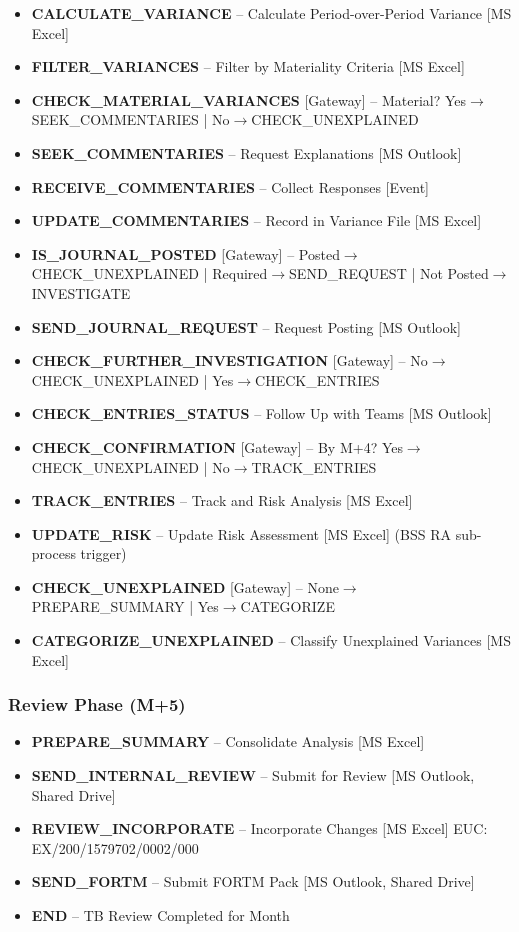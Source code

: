\documentclass[11pt,a4paper]{article}
\begin{document}
\begin{itemize}[noitemsep]
    \item \textbf{CALCULATE\_VARIANCE} -- Calculate Period-over-Period Variance [MS Excel]
    \item \textbf{FILTER\_VARIANCES} -- Filter by Materiality Criteria [MS Excel]
    \item \textbf{CHECK\_MATERIAL\_VARIANCES} [Gateway] -- Material? Yes$\rightarrow$SEEK\_COMMENTARIES | No$\rightarrow$CHECK\_UNEXPLAINED
    \item \textbf{SEEK\_COMMENTARIES} -- Request Explanations [MS Outlook]
    \item \textbf{RECEIVE\_COMMENTARIES} -- Collect Responses [Event]
    \item \textbf{UPDATE\_COMMENTARIES} -- Record in Variance File [MS Excel]
    \item \textbf{IS\_JOURNAL\_POSTED} [Gateway] -- Posted$\rightarrow$CHECK\_UNEXPLAINED | Required$\rightarrow$SEND\_REQUEST | Not Posted$\rightarrow$INVESTIGATE
    \item \textbf{SEND\_JOURNAL\_REQUEST} -- Request Posting [MS Outlook]
    \item \textbf{CHECK\_FURTHER\_INVESTIGATION} [Gateway] -- No$\rightarrow$CHECK\_UNEXPLAINED | Yes$\rightarrow$CHECK\_ENTRIES
    \item \textbf{CHECK\_ENTRIES\_STATUS} -- Follow Up with Teams [MS Outlook]
    \item \textbf{CHECK\_CONFIRMATION} [Gateway] -- By M+4? Yes$\rightarrow$CHECK\_UNEXPLAINED | No$\rightarrow$TRACK\_ENTRIES
    \item \textbf{TRACK\_ENTRIES} -- Track and Risk Analysis [MS Excel]
    \item \textbf{UPDATE\_RISK} -- Update Risk Assessment [MS Excel] (BSS RA sub-process trigger)
    \item \textbf{CHECK\_UNEXPLAINED} [Gateway] -- None$\rightarrow$PREPARE\_SUMMARY | Yes$\rightarrow$CATEGORIZE
    \item \textbf{CATEGORIZE\_UNEXPLAINED} -- Classify Unexplained Variances [MS Excel]
\end{itemize}

\subsubsection{Review Phase (M+5)}

\begin{itemize}[noitemsep]
    \item \textbf{PREPARE\_SUMMARY} -- Consolidate Analysis [MS Excel]
    \item \textbf{SEND\_INTERNAL\_REVIEW} -- Submit for Review [MS Outlook, Shared Drive]
    \item \textbf{REVIEW\_INCORPORATE} -- Incorporate Changes [MS Excel] EUC: EX/200/1579702/0002/000
    \item \textbf{SEND\_FORTM} -- Submit FORTM Pack [MS Outlook, Shared Drive]
    \item \textbf{END} -- TB Review Completed for Month
\end{itemize}
\end{document}

